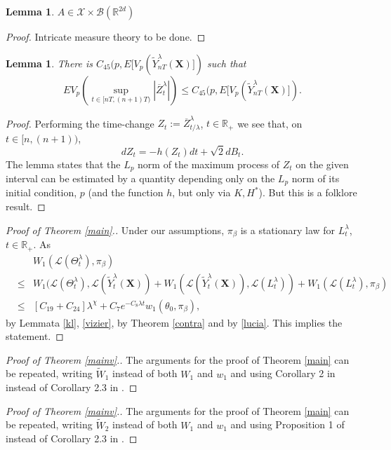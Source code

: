 \documentclass[a4paper,draft]{article}
\newtheorem{lemma}[theorem]{Lemma}
\begin{document}
\begin{lemma}
$A\in\mathcal{X}\times \mathcal{B}(\mathbb{R}^{2d})$
\end{lemma}
\begin{proof} Intricate measure theory to be done.
\end{proof}


\begin{lemma}\label{folklore} There is
$C_{45}(p,E[V_p(\tilde{Y}^{\lambda}_{nT}(\mathbf{X})])$ such that
$$
EV_p(\sup_{t\in [nT,(n+1)T)}|\overline{Z}^{\lambda}_t|)\leq C_{45}(p,E[V_p(\tilde{Y}^{\lambda}_{nT}(\mathbf{X})]).
$$
\end{lemma}
\begin{proof}
Performing the time-change $Z_t:=\overline{Z}^{\lambda}_{t/\lambda}$, $t\in\mathbb{R}_+$ we see
that, on $t\in [n,(n+1))$,
$$
dZ_t=-h(Z_t)dt+\sqrt{2}dB_t.
$$
The lemma states that the $L_p$ norm of the maximum process of $Z_t$ on the given interval can be
estimated by a quantity depending only on the $L_p$ norm of its initial condition, $p$ (and the
function $h$, but only via $K,H^*$). But this is a folklore result.
\end{proof}


\begin{proof}[Proof of Theorem \ref{main}.]
Under our assumptions, $\pi_{\beta}$ is a stationary law for $L^{\lambda}_t$, $t\in\mathbb{R}_+$.
As \begin{eqnarray*}
& & W_1(\mathcal{L}(\Theta^{\lambda}_t),\pi_{\beta})\\
&\leq& W_1(\mathcal{L}(\Theta^{\lambda}_t),\mathcal{L}(\tilde{Y}^{\lambda}_t(\mathbf{X}))
+ W_1(\mathcal{L}(\tilde{Y}^{\lambda}_t(\mathbf{X})),\mathcal{L}(L^{\lambda}_t))+
W_1(\mathcal{L}(L^{\lambda}_t),\pi_{\beta}) \\
&\leq& [C_{19}+C_{24}]\lambda^{\chi}+C_7 e^{-C_8\lambda t}w_1(\theta_0,\pi_{\beta}),
\end{eqnarray*}
by Lemmata \ref{kl}, \ref{vizier}, by Theorem \ref{contra} and by \eqref{lucia}.
This implies the statement.
\end{proof}

\begin{proof}[Proof of Theorem \ref{mainv}.]
The arguments for the proof of Theorem \ref{main} can be repeated, writing
$\tilde{W}_1$ instead of both $W_1$ and $w_1$ and using Corollary 2 in \cite{eberleold} instead of Corollary 2.3
in \cite{eberle}.
\end{proof}

\begin{proof}[Proof of Theorem \ref{mainv}.]
The arguments for the proof of Theorem \ref{main} can be repeated, writing
$\tilde{W}_2$ instead of both $W_1$ and $w_1$ and using Proposition 1 of \cite{aew} instead of Corollary 2.3
in \cite{eberle}.
\end{proof}
\end{document}
